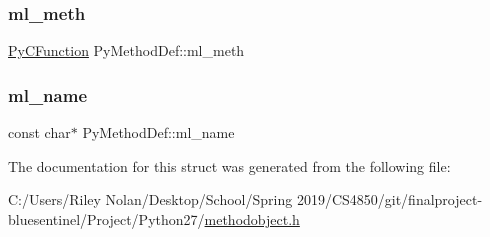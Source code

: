 \mbox{\label{struct_py_method_def_a2e99fd743a714b893d8735951000449e}} 
\subsubsection{\texorpdfstring{ml\_meth}{ml\_meth}}
{\footnotesize\ttfamily \mbox{\hyperlink{methodobject_8h_af268178dccdbfeb92ee45524b69d5674}{Py\+C\+Function}} Py\+Method\+Def\+::ml\+\_\+meth}

\mbox{\label{struct_py_method_def_a308a3fcf53e3b75685ed2ebf11cf77de}} 
\subsubsection{\texorpdfstring{ml\_name}{ml\_name}}
{\footnotesize\ttfamily const char$\ast$ Py\+Method\+Def\+::ml\+\_\+name}



The documentation for this struct was generated from the following file\+:\begin{DoxyCompactItemize}
\item 
C\+:/\+Users/\+Riley Nolan/\+Desktop/\+School/\+Spring 2019/\+C\+S4850/git/finalproject-\/bluesentinel/\+Project/\+Python27/\mbox{\hyperlink{methodobject_8h}{methodobject.\+h}}\end{DoxyCompactItemize}
